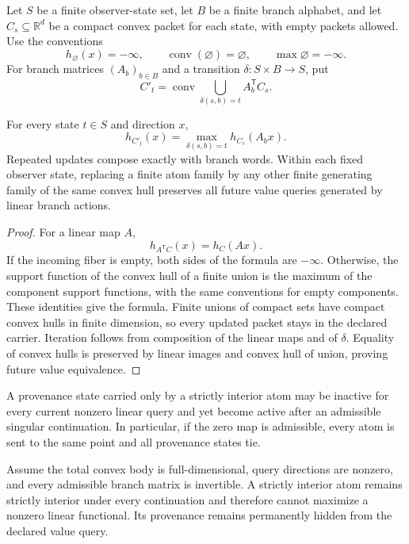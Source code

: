 Let \(S\) be a finite observer-state set, let \(B\) be a finite branch
alphabet, and let \(C_s\subseteq\mathbb R^d\) be a compact convex packet for
each state, with empty packets allowed.  Use the conventions
\[
 h_{\varnothing}(x)=-\infty,\qquad
 \operatorname{conv}(\varnothing)=\varnothing,\qquad
 \max\varnothing=-\infty.
\]
For branch matrices \((A_b)_{b\in B}\) and a transition
\(\delta:S\times B\to S\), put
\[
 C'_t
 =
 \operatorname{conv}
 \bigcup_{\delta(s,b)=t}A_b^{\mathsf T}C_s.
\]

\begin{theorem}
\label{thm:block18-convex-packet-transport}
For every state \(t\in S\) and direction \(x\),
\[
 h_{C'_t}(x)
 =
 \max_{\delta(s,b)=t}h_{C_s}(A_bx).
\]
Repeated updates compose exactly with branch words.  Within each fixed observer state, replacing a finite atom family by any other finite generating family of the same convex hull preserves all future value queries generated by linear branch actions.
\end{theorem}

\begin{proof}
For a linear map \(A\),
\[
 h_{A^{\mathsf T}C}(x)=h_C(Ax).
\]
If the incoming fiber is empty, both sides of the formula are \(-\infty\).
Otherwise, the support function of the convex hull of a finite union is the
maximum of the component support functions, with the same conventions for
empty components.  These identities give the formula.  Finite unions of
compact sets have compact convex hulls in finite dimension, so every updated
packet stays in the declared carrier.  Iteration follows from composition of the linear maps and of \(\delta\).  Equality of convex hulls is preserved by linear images and convex hull of union, proving future value equivalence.
\end{proof}

\begin{proposition}
\label{prop:block18-singular-resurrection}
A provenance state carried only by a strictly interior atom may be inactive for every current nonzero linear query and yet become active after an admissible singular continuation.  In particular, if the zero map is admissible, every atom is sent to the same point and all provenance states tie.
\end{proposition}

\begin{proposition}
\label{prop:block18-invertible-hiding}
Assume the total convex body is full-dimensional, query directions are nonzero, and every admissible branch matrix is invertible.  A strictly interior atom remains strictly interior under every continuation and therefore cannot maximize a nonzero linear functional.  Its provenance remains permanently hidden from the declared value query.
\end{proposition}

